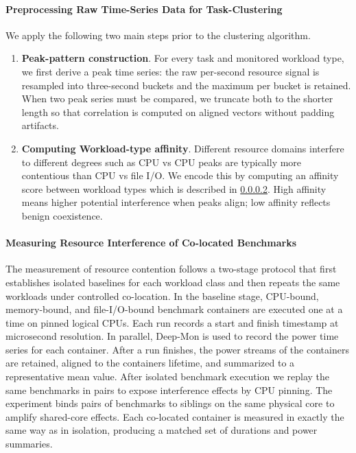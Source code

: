 \paragraph{Preprocessing Raw Time-Series Data for Task-Clustering}
\label{sec:data_preprocessing_predictive}

We apply the following two main steps prior to the clustering algorithm.

\begin{enumerate}
    \item \textbf{Peak-pattern construction}. For every task and monitored workload type, we first derive a peak time series: the raw per-second resource signal is resampled into three-second buckets and the maximum per bucket is retained. When two peak series must be compared, we truncate both to the shorter length so that correlation is computed on aligned vectors without padding artifacts.
    \item \textbf{Computing Workload-type affinity}. Different resource domains interfere to different degrees such as CPU vs CPU peaks are typically more contentious than CPU vs file I/O. We encode this by computing an affinity score between workload types which is described in \ref{sec:measuring_resource_contention}. High affinity means higher potential interference when peaks align; low affinity reflects benign coexistence.
\end{enumerate}

\paragraph{Measuring Resource Interference of Co-located Benchmarks}
\label{sec:measuring_resource_contention}

The measurement of resource contention follows a two-stage protocol that first establishes isolated baselines for each workload class and then repeats the same workloads under controlled co-location. In the baseline stage, CPU-bound, memory-bound, and file-I/O-bound benchmark containers are executed one at a time on pinned logical CPUs. Each run records a start and finish timestamp at microsecond resolution. In parallel, Deep-Mon is used to record the power time series for each container. After a run finishes, the power streams of the containers are retained, aligned to the containers lifetime, and summarized to a representative mean value.
After isolated benchmark execution we replay the same benchmarks in pairs to expose interference effects by CPU pinning. The experiment binds pairs of benchmarks to siblings on the same physical core to amplify shared-core effects. Each co-located container is measured in exactly the same way as in isolation, producing a matched set of durations and power summaries.


